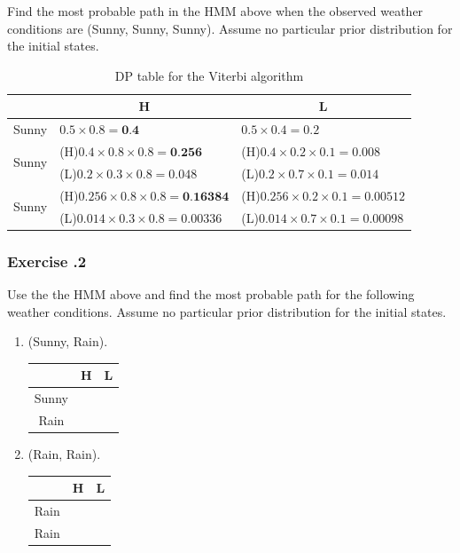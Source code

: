 Find the most probable path in the HMM above when the observed weather conditions are (Sunny, Sunny, Sunny). Assume no particular prior distribution for the initial states.

\begin{table}[H]
\centering
\caption{DP table for the Viterbi algorithm}
\label{my-label}
\begin{tabular}{|c|l|l|}
\hline
                       & \multicolumn{1}{c|}{H}     & \multicolumn{1}{c|}{L}     \\ \hline
Sunny                  & $0.5 \times 0.8 = \textbf{0.4}$              & $0.5 \times 0.4 = 0.2$              \\ \hline
\multirow{2}{*}{Sunny} & (H)$0.4 \times 0.8 \times 0.8 = \textbf{0.256}$     & (H)$0.4 \times 0.2 \times 0.1 = 0.008$     \\
                       & (L)$0.2 \times 0.3 \times 0.8 = 0.048$     & (L)$0.2 \times 0.7 \times 0.1 = 0.014$     \\ \hline
\multirow{2}{*}{Sunny} & (H)$0.256 \times 0.8 \times 0.8 = \textbf{0.16384}$ & (H)$0.256 \times 0.2 \times 0.1= 0.00512$  \\
                       & (L)$0.014 \times 0.3 \times 0.8 = 0.00336$ & (L)$0.014 \times 0.7 \times 0.1 = 0.00098$ \\ \hline
\end{tabular}
\end{table}

%
%
\subsubsection*{Exercise \thesection.2}
Use the the HMM above and find the most probable path for the following weather conditions. Assume no particular prior distribution for the initial states.

\begin{enumerate}
\item (Sunny, Rain).
\begin{table}[H]
\centering
\begin{tabular}{|c|c|c|}
\hline
      & H & L \\ \hline
Sunny & \quad \quad \quad \quad  \quad \quad \quad \quad &  \quad \quad \quad \quad \quad \quad \quad \quad \\ \hline
Rain  &   &    \\ \hline
\end{tabular}
\end{table}

\item (Rain, Rain).
\begin{table}[H]
\centering
\begin{tabular}{|c|c|c|}
\hline
      & H & L \\ \hline
Rain & \quad \quad \quad \quad  \quad \quad \quad \quad &  \quad \quad \quad \quad \quad \quad \quad \quad \\ \hline
Rain  &   &    \\ \hline
\end{tabular}
\end{table}

\end{enumerate}

\bigskip 

%
